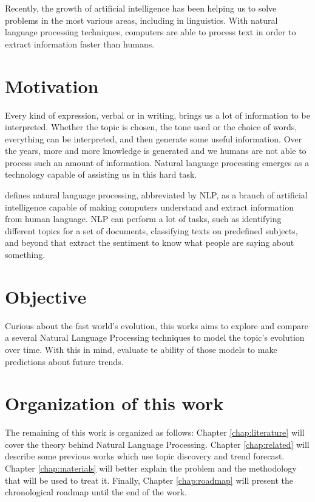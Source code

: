 Recently, the growth of artificial intelligence has been helping us to solve problems in the most various areas, including in linguistics. With natural language processing techniques, computers are able to process text in order to extract information faster than humans.


\section{Motivation}

Every kind of expression, verbal or in writing, brings us a lot of information to be interpreted. Whether the topic is chosen, the tone used or the choice of words, everything can be interpreted, and then generate some useful information. Over the years, more and more knowledge is generated and we humans are not able to process such an amount of information. Natural language processing emerges as a technology capable of assisting us in this hard task.

 defines natural language processing, abbreviated by NLP, as a branch of artificial intelligence capable of making computers understand and extract information from human language. NLP can perform a lot of tasks, such as identifying different topics for a set of documents, classifying texts on predefined subjects, and beyond that extract the sentiment to know what people are saying about something.

% 

\section{Objective}

Curious about the fast world's evolution, this works aims to explore and compare a several Natural Language Processing techniques to model the topic's evolution over time. With this in mind, evaluate te ability of those models to make predictions about future trends.


\section{Organization of this work}

The remaining of this work is organized as follows: Chapter \ref{chap:literature} will cover the theory behind Natural Language Processing. Chapter \ref{chap:related} will describe some previous works which use topic discovery and trend forecast. Chapter \ref{chap:materials} will better explain the problem and the methodology that will be used to treat it. Finally, Chapter \ref{chap:roadmap} will present the chronological roadmap until the end of the work.